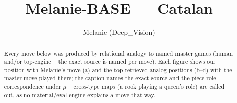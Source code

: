 \documentclass[11pt]{article}
\title{Melanie-BASE — Catalan}
\author{Melanie (Deep\_Vision)}
\date{}
\begin{document}
\maketitle

\begin{abstract}Every move below was produced by relational analogy to named master games (human and/or top-engine -- the exact source is named per move). Each figure shows our position with Melanie's move (a) and the top retrieved analog positions (b--d) with the master move played there; the caption names the exact source and the piece-role correspondence under $\mu$ -- cross-type maps (a rook playing a queen's role) are called out, as no material/eval engine explains a move that way.\end{abstract}

\begin{figure}[p]\centering
\begin{subfigure}{0.46\textwidth}\centering
\resizebox{\linewidth}{!}{%
\newchessgame
\chessboard[
  setfen={rnbq1rk1/ppp1bppp/4pn2/4N3/2pP4/6P1/PP2PPBP/RNBQ1RK1 b - - 1 7},
  showmover=false,
  pgfstyle=straightmove, color=movearrow, markmove={f6-d5}
]}
\caption{}
\end{subfigure}\hfill
\begin{subfigure}{0.46\textwidth}\centering
\resizebox{\linewidth}{!}{%
\newchessgame
\chessboard[
  setfen={rnbq1rk1/pp2bppp/2p1pn2/4N3/2pP1B2/6P1/PP2PPBP/RN1Q1RK1 b - - 1 9},
  showmover=false,
  pgfstyle=straightmove, color=movearrow, markmove={f6-d5}
]}
\caption{}
\end{subfigure}
\\[4pt]
\begin{subfigure}{0.46\textwidth}\centering
\resizebox{\linewidth}{!}{%
\newchessgame
\chessboard[
  setfen={rnbq1rk1/pp2bppp/2p1pn2/4N3/2pP1B2/6P1/PP2PPBP/RN1Q1RK1 b - - 1 9},
  showmover=false,
  pgfstyle=straightmove, color=movearrow, markmove={f6-d5}
]}
\caption{}
\end{subfigure}\hfill
\begin{subfigure}{0.46\textwidth}\centering
\resizebox{\linewidth}{!}{%
\newchessgame
\chessboard[
  setfen={rnbq1rk1/pp2bppp/2p1pn2/4N3/2pP1B2/6P1/PP2PPBP/RN1Q1RK1 b - - 1 9},
  showmover=false,
  pgfstyle=straightmove, color=movearrow, markmove={f6-d5}
]}
\caption{}
\end{subfigure}

\end{figure}
\end{document}
